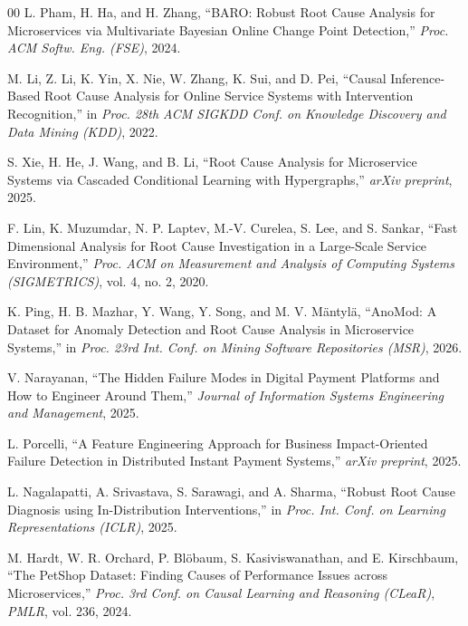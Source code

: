 \documentclass[conference]{IEEEtran}
\begin{document}
\begin{thebibliography}{00}
 L. Pham, H. Ha, and H. Zhang, ``BARO: Robust Root Cause Analysis for Microservices via
Multivariate Bayesian Online Change Point Detection,'' \emph{Proc. ACM Softw. Eng. (FSE)}, 2024.

 M. Li, Z. Li, K. Yin, X. Nie, W. Zhang, K. Sui, and D. Pei, ``Causal Inference-Based Root
Cause Analysis for Online Service Systems with Intervention Recognition,'' in \emph{Proc. 28th ACM SIGKDD
Conf. on Knowledge Discovery and Data Mining (KDD)}, 2022.

 S. Xie, H. He, J. Wang, and B. Li, ``Root Cause Analysis for Microservice Systems via
Cascaded Conditional Learning with Hypergraphs,'' \emph{arXiv preprint}, 2025.

 F. Lin, K. Muzumdar, N. P. Laptev, M.-V. Curelea, S. Lee, and S. Sankar, ``Fast
Dimensional Analysis for Root Cause Investigation in a Large-Scale Service Environment,'' \emph{Proc. ACM on
Measurement and Analysis of Computing Systems (SIGMETRICS)}, vol. 4, no. 2, 2020.

 K. Ping, H. B. Mazhar, Y. Wang, Y. Song, and M. V. M\"antyl\"a, ``AnoMod: A Dataset for
Anomaly Detection and Root Cause Analysis in Microservice Systems,'' in \emph{Proc. 23rd Int. Conf. on Mining
Software Repositories (MSR)}, 2026.

 V. Narayanan, ``The Hidden Failure Modes in Digital Payment Platforms and How
to Engineer Around Them,'' \emph{Journal of Information Systems Engineering and Management}, 2025.

 L. Porcelli, ``A Feature Engineering Approach for Business Impact-Oriented Failure Detection
in Distributed Instant Payment Systems,'' \emph{arXiv preprint}, 2025.

 L. Nagalapatti, A. Srivastava, S. Sarawagi, and A. Sharma, ``Robust Root Cause Diagnosis
using In-Distribution Interventions,'' in \emph{Proc. Int. Conf. on Learning Representations (ICLR)}, 2025.

 M. Hardt, W. R. Orchard, P. Bl\"obaum, S. Kasiviswanathan, and E. Kirschbaum, ``The
PetShop Dataset: Finding Causes of Performance Issues across Microservices,'' \emph{Proc. 3rd Conf. on Causal
Learning and Reasoning (CLeaR)}, \emph{PMLR}, vol. 236, 2024.

\end{thebibliography}
\end{document}
